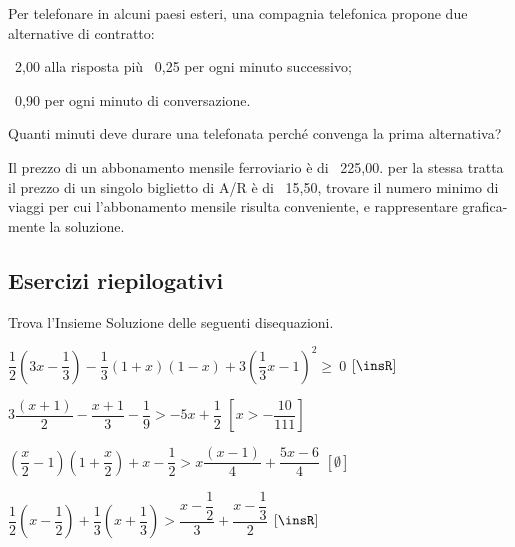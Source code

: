 \begin{multicols}{2}
 \begin{esercizio}[]
 \label{ese:dis_}
 Per telefonare in alcuni paesi esteri, una compagnia telefonica
propone due alternative di contratto:
\begin{enumeratea}
 \item \officialeuro\ 2,00 alla risposta più \officialeuro\ 0,25 per ogni 
minuto successivo;
\item \officialeuro\ 0,90 per ogni minuto di conversazione.
\end{enumeratea}
Quanti minuti deve durare una telefonata perché convenga la prima
alternativa?
 \end{esercizio}

\begin{esercizio}[]
 \label{ese:dis_}
 Il prezzo di un abbonamento mensile ferroviario è di \officialeuro\ 225,00.
 per la stessa tratta il prezzo di un singolo biglietto di A/R è 
di \officialeuro\ 15,50, trovare il numero minimo di viaggi per
cui l'abbonamento mensile risulta conveniente, e
rappresentare grafica-mente la soluzione.
 \end{esercizio}


\end{multicols}

\subsection{Esercizi riepilogativi}

\begin{esercizio}[\Ast]
 \label{ese:21.15}
Trova l'Insieme Soluzione delle seguenti disequazioni.
 \begin{enumeratea}
\item
 \(\dfrac{1}{2}\left(3x-\dfrac{1}{3}\right)-\dfrac{1}{3}(1+x)(1-x)+
  3\left(\dfrac{1}{3}x-1\right)^{2}\ge~0\)
 \hfill \(\left[\insR\right]\)
\item
 \(3\dfrac{(x+1)}{2}-\dfrac{x+1}{3}-\dfrac{1}{9}>-5x+\dfrac{1}{2}\)
 \hfill \(\left[x>-{\dfrac{10}{111}}\right]\)
\item
 \(\left(\dfrac{x}{2}-1\right)\left(1+\dfrac{x}{2}\right)+x-\dfrac{1}{2}>
  x\dfrac{(x-1)}{4}+\dfrac{5x-6}{4}\)
 \hfill \(\left[\emptyset\right]\)
\item
 \(\dfrac{1}{2}\left(x-\dfrac{1}{2}\right)+\dfrac{1}{3}\left(x+
  \dfrac{1}{3}\right)>\dfrac{x-\dfrac{1}{2}}{3}+\dfrac{x-\dfrac{1}{3}}{2}\)
 \hfill \(\left[\insR\right]\)
\end{enumeratea}
\end{esercizio}

